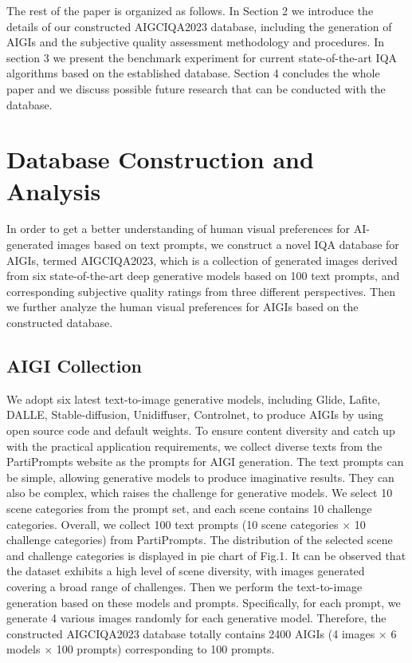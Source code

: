 \documentclass[runningheads]{llncs}
\begin{document}
The rest of the paper is organized as follows. In Section 2 we introduce the details of our constructed AIGCIQA2023 database, including the generation of AIGIs and the subjective quality assessment methodology and procedures.
In section 3 we present the benchmark experiment for current state-of-the-art IQA algorithms based on the established database. 
Section 4 concludes the whole paper and we discuss possible future research that can be conducted with the database.


\section{Database Construction and Analysis}
In order to get a better understanding of human visual preferences for AI-generated images based on text prompts, we construct a novel IQA database for AIGIs, termed AIGCIQA2023, which is a collection of generated images derived from six state-of-the-art deep generative models based on 100 text prompts, and corresponding subjective quality ratings from three different perspectives.
Then we further analyze the human visual preferences for AIGIs based on the constructed database.

\subsection{AIGI Collection}

We adopt six latest text-to-image generative models, including Glide\cite{Nichol2021GLIDETP}, Lafite\cite{Zhou_2022_CVPR}, DALLE\cite{ramesh2022hierarchical}, Stable-diffusion\cite{Rombach2021HighResolutionIS}, Unidiffuser\cite{Bao2023OneTF}, Controlnet\cite{Zhang2023AddingCC}, to produce AIGIs by using open source code and default weights.
To ensure content diversity and catch up with the practical application requirements, we collect diverse texts from the PartiPrompts website \cite{yu2022scaling} as the prompts for AIGI generation.
The text prompts can be simple, allowing generative models to produce imaginative results.
They can also be complex, which raises the challenge for generative models.
We select 10 scene categories from the prompt set, and each scene contains 10 challenge categories.
Overall, we collect 100 text prompts (10 scene categories $\times$ 10 challenge categories) from PartiPrompts\cite{yu2022scaling}.
The distribution of the selected scene and challenge categories is displayed in pie chart of Fig.1.
It can be observed that the dataset exhibits a high level of scene diversity, with images generated covering a broad range of challenges.
Then we perform the text-to-image generation based on these models and prompts. Specifically, for each prompt, we generate 4 various images randomly for each generative model. Therefore, the constructed AIGCIQA2023 database totally contains 2400 AIGIs (4 images $\times$ 6 models $\times$ 100 prompts) corresponding to 100 prompts.

\end{document}
